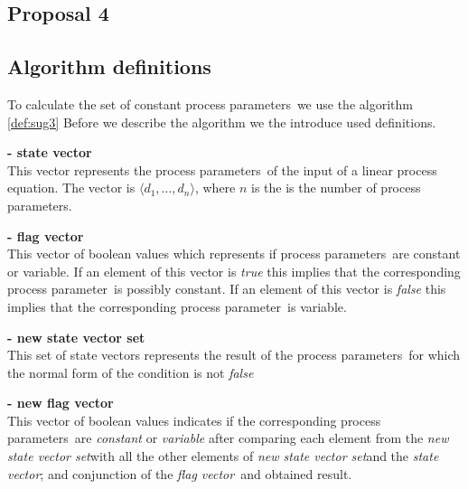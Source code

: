 \documentclass[a4paper,10pt]{article}
\theoremstyle{plain}
\theoremstyle{definition}
\newcommand{\lpe}{linear process equation}
\newcommand{\ovr}{\overrightarrow}
\newcommand{\pp}{process parameter}
\newcommand{\pps}{process parameters}
\newcommand{\ti}{\textit}
\newcommand{\sv}{\textit{state vector}}
\newcommand{\fv}{\textit{flag vector}}
\newcommand{\svs}{\textit{new state vector set}}
\begin{document}
\subsection{Proposal 4}



\subsection{Algorithm definitions}
To calculate the set of constant \pps\ we use the algorithm
\ref{def:sug3} Before we describe the algorithm we the introduce
used definitions. 

\begin{defn} \textbf{- state vector} \label{sv}\\
This vector represents the \pps\ of the input of a \lpe . The vector is 
$\langle d_1, \ldots, d_n \rangle$, where $n$ is the is the number
of \pps . 
\end{defn}

\begin{defn} \textbf{- flag vector}\\
This vector of boolean values which represents if \pps\
are constant or variable. If an element of this vector is \ti{true}
this implies that the corresponding \pp\ is possibly constant. If an element
of this vector is \ti{false} this implies that the corresponding
\pp\ is variable.
\end{defn}

\begin{defn} \textbf{- new state vector set}\\
 This set of state vectors represents the result of the
\pps\ for which the normal form of the condition is not \ti{false}
\end{defn} 

\begin{defn}
\textbf{- new flag vector} \\
This vector of boolean values indicates if the
corresponding \pps\ are \ti{constant} or \ti{variable} after comparing each element from the \svs with all the other elements of \svs  and the \sv; and conjunction of the \fv\ and obtained result. 
\end{defn}
\end{document}
